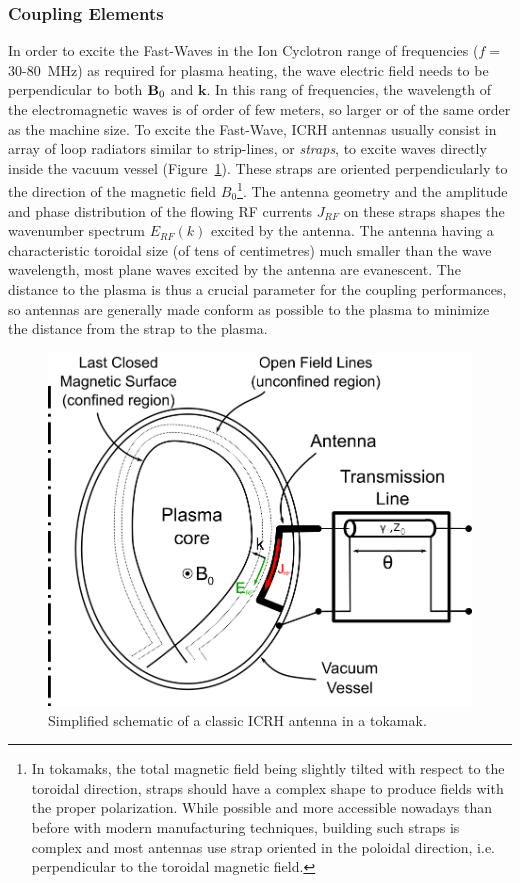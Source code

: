 \subsubsection{Coupling Elements}
In order to excite the Fast-Waves in the Ion Cyclotron range of frequencies ($f=$30-80~MHz) as required for plasma heating, the wave electric field needs to be perpendicular to both ${\mathbf B}_0$ and $\mathbf{k}$. In this rang of frequencies, the wavelength of the electromagnetic waves is of order of few meters, so larger or of the same order as the machine size. To excite the Fast-Wave, ICRH antennas usually consist in array of loop radiators similar to strip-lines, or \textit{straps}, to excite waves directly inside the vacuum vessel (Figure~\ref{fig:icrhantennasimplified}). These straps are oriented perpendicularly to the direction of the magnetic field $B_0$\footnote{In tokamaks, the total magnetic field being slightly tilted with respect to the toroidal direction, straps should have a complex shape to produce fields with the proper polarization. While possible and more accessible nowadays than before with modern manufacturing techniques, building such straps is complex and most antennas use strap oriented in the poloidal direction, i.e. perpendicular to the toroidal magnetic field.}. The antenna geometry and the amplitude and phase distribution of the flowing RF currents $J_{RF}$ on these straps shapes the wavenumber spectrum $E_{RF}(k)$ excited by the antenna. The antenna having a characteristic toroidal size (of tens of centimetres) much smaller than the wave wavelength, most plane waves excited by the antenna are evanescent. The distance to the plasma is thus a crucial parameter for the coupling performances, so antennas are generally made conform as possible to the plasma to minimize the distance from the strap to the plasma. 

\begin{figure}[h]
	\centering
	\includegraphics[width=0.9\linewidth]{figures/chap3/ICRH_antenna_simplified}
	\caption{Simplified schematic of a classic ICRH antenna in a tokamak.}
	\label{fig:icrhantennasimplified}
\end{figure}


